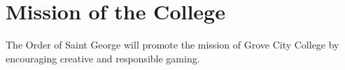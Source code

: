 {
	\section{Mission of the College}
	The Order of Saint George will promote the mission of Grove City College by encouraging creative and responsible gaming.
}